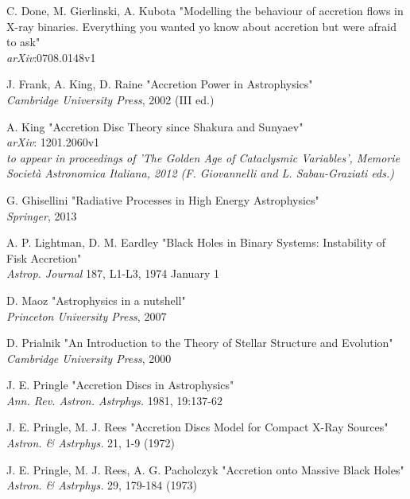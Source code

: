\documentclass[a4paperbi]{article}
\begin{document}
\begin{thebibliography}{9}

	C. Done, M. Gierlinski, A. Kubota
	"Modelling the behaviour of accretion flows in X-ray binaries. Everything you wanted yo know about accretion but were afraid to ask"\\
	\textit{arXiv}:0708.0148v1

	J. Frank, A. King, D. Raine
	"Accretion Power in Astrophysics"\\
	\textit{Cambridge University Press}, 2002 (III ed.)
	
	A. King 
	"Accretion Disc Theory since Shakura and Sunyaev"\\
	\textit{arXiv}: 1201.2060v1\\
	\textit{to appear in proceedings of 'The Golden Age of Cataclysmic Variables', Memorie Società Astronomica Italiana, 2012 (F. Giovannelli and L. Sabau-Graziati eds.)}
	
	G. Ghisellini
	"Radiative Processes in High Energy Astrophysics"\\
	\textit{Springer}, 2013
	
	A. P. Lightman, D. M. Eardley 
	"Black Holes in Binary Systems: Instability of Fisk Accretion"\\
	\textit{Astrop. Journal} 187, L1-L3, 1974 January 1
	
	D. Maoz
	"Astrophysics in a nutshell"\\
	\textit{Princeton University Press}, 2007
	
	D. Prialnik
	"An Introduction to the Theory of Stellar Structure and Evolution"\\
	\textit{Cambridge University Press}, 2000
	
	J. E. Pringle 
	"Accretion Discs in Astrophysics"\\
	\textit{Ann. Rev. Astron. Astrphys.} 1981, 19:137-62
	
	J. E. Pringle, M. J. Rees
	"Accretion Discs Model for Compact X-Ray Sources"\\
	\textit{Astron. \& Astrphys.} 21, 1-9 (1972)
	
	J. E. Pringle, M. J. Rees, A. G. Pacholczyk
	"Accretion onto Massive Black Holes"\\
	\textit{Astron. \& Astrphys.} 29, 179-184 (1973)
	

\end{thebibliography}
\end{document}
